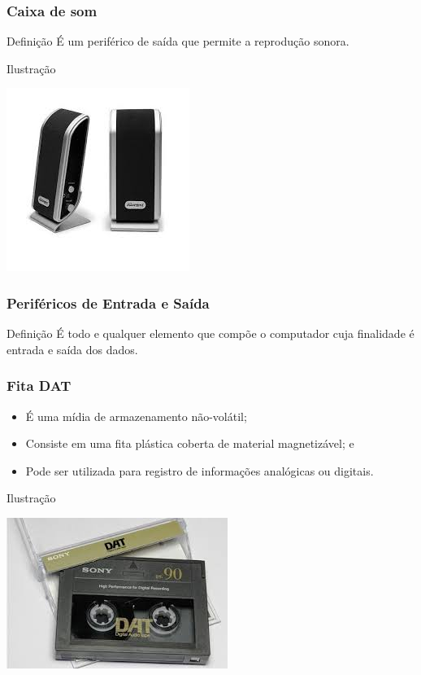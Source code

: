 \documentclass[aspectratio=169]{beamer} %
\begin{document}
\begin{frame}
	\frametitle{Caixa de som}
	
	\begin{block}{Defini\c cão}
		É um periférico de saída que permite a reprodução sonora.
	\end{block}\vfill
	
	\begin{exampleblock}{Ilustra\c cão}
		\begin{center}
			\includegraphics[scale=0.5]{img/caixa-de-som}
		\end{center}		
	\end{exampleblock}
\end{frame}


\begin{frame}
	\frametitle{Periféricos de Entrada e Saída}
	
	\begin{block}{Defini\c cão}
		É todo e qualquer elemento que compõe o computador cuja finalidade é entrada e saída dos dados.
	\end{block}
\end{frame}

\begin{frame}
	\frametitle{Fita DAT}
		
	\begin{itemize}
		\item É uma mídia de armazenamento não-volátil;
		\item Consiste em uma fita plástica coberta de material magnetizável; e 
		\item Pode ser utilizada para registro de informações analógicas ou digitais.
	\end{itemize}\vfill
	
	\begin{exampleblock}{Ilustra\c cão}
		\begin{center}
			\includegraphics[scale=0.4]{img/fita_dat}
		\end{center}		
	\end{exampleblock}
\end{frame}
\end{document}
